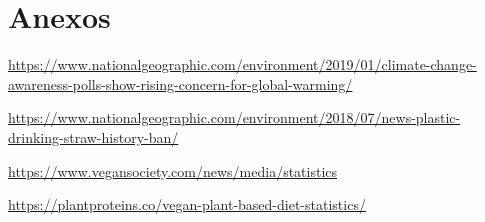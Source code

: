 \documentclass{article}
\begin{document}
\section{Anexos}
\begin{enumerate}[label={[\arabic*]}]
    \item \url{https://www.nationalgeographic.com/environment/2019/01/climate-change-awareness-polls-show-rising-concern-for-global-warming/}
    \item \url{https://www.nationalgeographic.com/environment/2018/07/news-plastic-drinking-straw-history-ban/} 
    \item \url{https://www.vegansociety.com/news/media/statistics}  
    \item \url{https://plantproteins.co/vegan-plant-based-diet-statistics/}
\end{enumerate}
\end{document}
